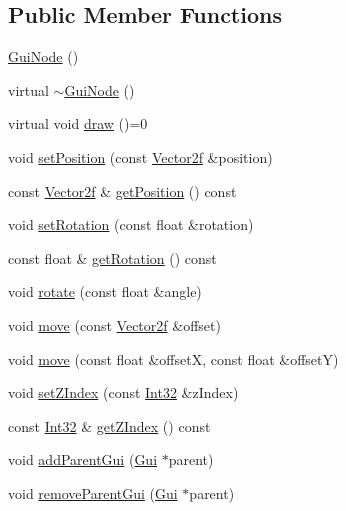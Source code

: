 \subsection*{Public Member Functions}
\begin{DoxyCompactItemize}
\item 
\hyperlink{classburn_1_1_gui_node_ae908f29b71dda5ea724c742cfda3cd2a}{Gui\-Node} ()
\item 
virtual \hyperlink{classburn_1_1_gui_node_a5c047d11bef782a5261ce24d946612a8}{$\sim$\-Gui\-Node} ()
\item 
virtual void \hyperlink{classburn_1_1_gui_node_ac283552733ae59c4f1b7fa05c79cb517}{draw} ()=0
\item 
void \hyperlink{classburn_1_1_gui_node_a75f542965a10945fa2894a722def8337}{set\-Position} (const \hyperlink{namespaceburn_af5ed9eb70cbf0fb572098ff43e146a0a}{Vector2f} \&position)
\item 
const \hyperlink{namespaceburn_af5ed9eb70cbf0fb572098ff43e146a0a}{Vector2f} \& \hyperlink{classburn_1_1_gui_node_af3ddf018a01e587d110d44c16baa5ae8}{get\-Position} () const 
\item 
void \hyperlink{classburn_1_1_gui_node_aa02ac7225479a0a5652b6b759ba66dc7}{set\-Rotation} (const float \&rotation)
\item 
const float \& \hyperlink{classburn_1_1_gui_node_acc490b42584e6008b828a4251a88600a}{get\-Rotation} () const 
\item 
void \hyperlink{classburn_1_1_gui_node_a780a3f0e7fc21e5ab98f01e4bd5d87a3}{rotate} (const float \&angle)
\item 
void \hyperlink{classburn_1_1_gui_node_a4ad80df2dd7319d5ad7c036369ddf95b}{move} (const \hyperlink{namespaceburn_af5ed9eb70cbf0fb572098ff43e146a0a}{Vector2f} \&offset)
\item 
void \hyperlink{classburn_1_1_gui_node_a8e75af236c12312492e06242b8b58c13}{move} (const float \&offset\-X, const float \&offset\-Y)
\item 
void \hyperlink{classburn_1_1_gui_node_a12fdf6059b778dfbdc8737befcf09018}{set\-Z\-Index} (const \hyperlink{namespaceburn_a96c2e82d6da686c64a6f330628466b05}{Int32} \&z\-Index)
\item 
const \hyperlink{namespaceburn_a96c2e82d6da686c64a6f330628466b05}{Int32} \& \hyperlink{classburn_1_1_gui_node_a6d12929d442ae3e2a92704dfe9a26c12}{get\-Z\-Index} () const 
\item 
void \hyperlink{classburn_1_1_gui_node_a7636e6452ab00f08bfbc0841fb843788}{add\-Parent\-Gui} (\hyperlink{classburn_1_1_gui}{Gui} $\ast$parent)
\item 
void \hyperlink{classburn_1_1_gui_node_ad67e018354a2c81d64658aece6efb7c3}{remove\-Parent\-Gui} (\hyperlink{classburn_1_1_gui}{Gui} $\ast$parent)
\end{DoxyCompactItemize}
